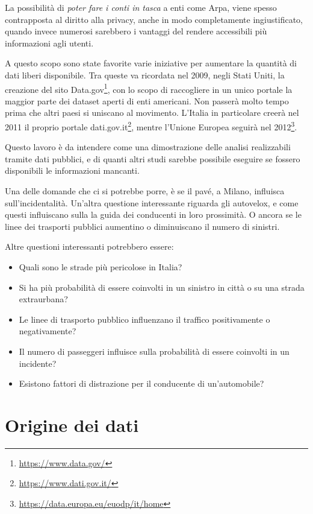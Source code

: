 \documentclass[a4paper]{report}
\newcommand{\quotestyle}[1]{\textit{#1}}
\newcommand{\skipline}{\vspace{0.2in}}
\begin{document}
La possibilità di \quotestyle{poter fare i conti in tasca} a enti come Arpa, 
viene spesso contrapposta al diritto alla privacy, anche in 
modo completamente ingiustificato, quando invece numerosi sarebbero i vantaggi 
del rendere accessibili più informazioni agli utenti.

A questo scopo sono state favorite varie iniziative per aumentare la quantità di 
dati liberi disponibile. 
Tra queste va ricordata nel 2009, negli Stati Uniti, la creazione del sito 
Data.gov\footnote{\url{https://www.data.gov/}}, 
con lo scopo di raccogliere in un unico portale la maggior parte dei dataset 
aperti di enti americani. 
Non passerà molto tempo prima che altri paesi si uniscano al movimento. 
L'Italia in particolare creerà nel 2011 il proprio portale 
dati.gov.it\footnote{\url{https://www.dati.gov.it/}}, mentre l'Unione Europea seguirà 
nel 2012\footnote{\url{https://data.europa.eu/euodp/it/home}}. 

\skipline
Questo lavoro è da intendere come una dimostrazione delle analisi realizzabili 
tramite dati pubblici, e di quanti altri studi sarebbe possibile eseguire se fossero 
disponibili le informazioni mancanti. 

Una delle domande che ci si potrebbe porre, è se il pavé, a Milano, 
influisca sull'incidentalità. 
Un'altra questione interessante riguarda gli autovelox, e come questi influiscano sulla 
la guida dei conducenti in loro prossimità. 
O ancora se le linee dei trasporti pubblici aumentino o diminuiscano il numero di sinistri. 

Altre questioni interessanti potrebbero essere:
\begin{itemize}
    \item Quali sono le strade più pericolose in Italia?
    \item Si ha più probabilità di essere coinvolti in un sinistro in città o su una 
    strada extraurbana? 
    \item Le linee di trasporto pubblico influenzano il traffico positivamente 
    o negativamente?
    \item Il numero di passeggeri influisce sulla probabilità di essere coinvolti 
    in un incidente? 
    \item Esistono fattori di distrazione per il conducente di un'automobile? 
\end{itemize}

\chapter{Origine dei dati}
\end{document}
